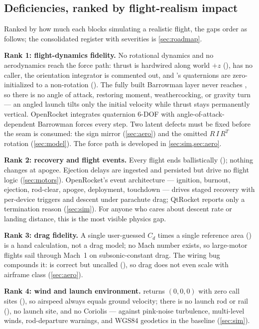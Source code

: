 \subsection{Deficiencies, ranked by flight-realism impact}\label{sec:comparison-gaps}

Ranked by how much each blocks simulating a realistic flight, the gaps order as follows; the
consolidated register with severities is \cref{sec:roadmap}.

\textbf{Rank 1: flight-dynamics fidelity.} No rotational dynamics and no aerodynamics reach the
force path: thrust is hardwired along world $+z$ (),
 has no caller, the orientation integrator is commented out, and
's quaternions are zero-initialized to a non-rotation
(). The fully built Barrowman layer never reaches , so
there is no angle of attack, restoring moment, weathercocking, or gravity turn --- an angled
launch tilts only the initial velocity while thrust stays permanently vertical. OpenRocket
integrates quaternion 6-DOF with angle-of-attack-dependent Barrowman forces every step. Two
latent defects must be fixed before the seam is consumed: the  sign mirror
(\cref{sec:aero}) and the omitted $R\,I\,R^{T}$ rotation (\cref{sec:model}). The force path is
developed in \cref{sec:sim,sec:aero}.

\textbf{Rank 2: recovery and flight events.} Every flight ends ballistically
(); nothing changes at apogee. Ejection delays are ingested and
persisted but drive no flight logic (\cref{sec:motors}). OpenRocket's event architecture ---
ignition, burnout, ejection, rod-clear, apogee, deployment, touchdown --- drives staged recovery
with per-device triggers and descent under parachute drag; QtRocket reports only a termination
reason (\cref{sec:sim}). For anyone who cares about descent rate or landing distance, this is
the most visible physics gap.

\textbf{Rank 3: drag fidelity.} A single user-guessed $C_d$ times a single reference area
() is a hand calculation, not a drag model; no Mach number
exists, so large-motor flights sail through Mach~1 on subsonic-constant drag. The wiring bug
compounds it:  is correct but uncalled
(), so drag does not even scale with airframe class
(\cref{sec:aero}).

\textbf{Rank 4: wind and launch environment.}  returns $(0,0,0)$ with zero call
sites (), so airspeed always equals ground velocity; there is no
launch rod or rail (), no launch site, and no Coriolis --- against
pink-noise turbulence, multi-level winds, rod-departure warnings, and WGS84 geodetics in the
baseline (\cref{sec:sim}).

